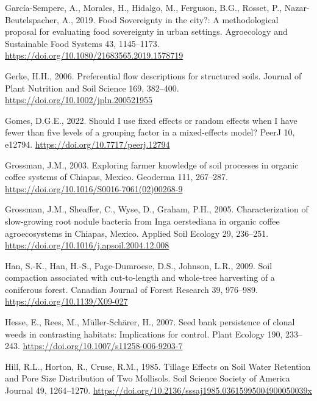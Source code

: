 \documentclass[
  12pt,
]{article}
\newlength{\cslhangindent}
\newlength{\cslentryspacingunit} %
\newenvironment{CSLReferences}[2] %
 {%
  \setlength{\parindent}{0pt}
  \ifodd #1
  \let\oldpar\par
  \def\par{\hangindent=\cslhangindent\oldpar}
  \fi
  \setlength{\parskip}{#2\cslentryspacingunit}
 }%
 {}
\begin{document}
\begin{CSLReferences}{1}{0}
\leavevmode{}%
García-Sempere, A., Morales, H., Hidalgo, M., Ferguson, B.G., Rosset, P., Nazar-Beutelspacher, A., 2019. Food {Sovereignty} in the city?: {A} methodological proposal for evaluating food sovereignty in urban settings. Agroecology and Sustainable Food Systems 43, 1145--1173. \url{https://doi.org/10.1080/21683565.2019.1578719}

\leavevmode{}%
Gerke, H.H., 2006. Preferential flow descriptions for structured soils. Journal of Plant Nutrition and Soil Science 169, 382--400. \url{https://doi.org/10.1002/jpln.200521955}

\leavevmode{}%
Gomes, D.G.E., 2022. Should {I} use fixed effects or random effects when {I} have fewer than five levels of a grouping factor in a mixed-effects model? PeerJ 10, e12794. \url{https://doi.org/10.7717/peerj.12794}

\leavevmode{}%
Grossman, J.M., 2003. Exploring farmer knowledge of soil processes in organic coffee systems of {Chiapas}, {Mexico}. Geoderma 111, 267--287. \url{https://doi.org/10.1016/S0016-7061(02)00268-9}

\leavevmode{}%
Grossman, J.M., Sheaffer, C., Wyse, D., Graham, P.H., 2005. Characterization of slow-growing root nodule bacteria from {Inga} oerstediana in organic coffee agroecosystems in {Chiapas}, {Mexico}. Applied Soil Ecology 29, 236--251. \url{https://doi.org/10.1016/j.apsoil.2004.12.008}

\leavevmode{}%
Han, S.-K., Han, H.-S., Page-Dumroese, D.S., Johnson, L.R., 2009. Soil compaction associated with cut-to-length and whole-tree harvesting of a coniferous forest. Canadian Journal of Forest Research 39, 976--989. \url{https://doi.org/10.1139/X09-027}

\leavevmode{}%
Hesse, E., Rees, M., Müller-Schärer, H., 2007. Seed bank persistence of clonal weeds in contrasting habitats: Implications for control. Plant Ecology 190, 233--243. \url{https://doi.org/10.1007/s11258-006-9203-7}

\leavevmode{}%
Hill, R.L., Horton, R., Cruse, R.M., 1985. Tillage {Effects} on {Soil Water Retention} and {Pore Size Distribution} of {Two Mollisols}. Soil Science Society of America Journal 49, 1264--1270. \url{https://doi.org/10.2136/sssaj1985.03615995004900050039x}


\end{CSLReferences}
\end{document}
